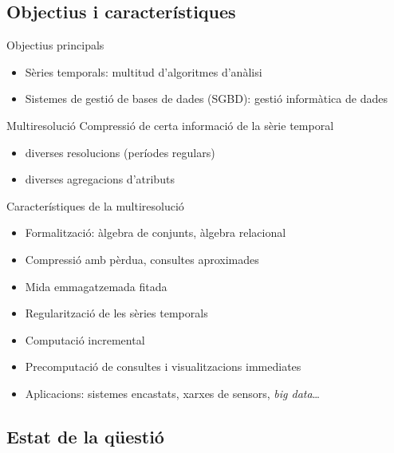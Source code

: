 \subsection{Objectius i característiques}
\begin{frame}{Objectius principals}

  \begin{itemize}
  \item Sèries temporals: multitud d'algoritmes d'anàlisi
  \item Sistemes de gestió de bases de dades (SGBD): gestió informàtica de dades
  \end{itemize} 

\begin{block}{Multiresolució}
  Compressió de certa informació de la sèrie temporal
    \begin{itemize}
    \item diverses resolucions (períodes regulars)
    \item diverses agregacions d'atributs 
    \end{itemize}
\end{block}


\end{frame}


\begin{frame}{Característiques de la multiresolució}

  \begin{itemize}
  \item Formalització: àlgebra de conjunts, àlgebra relacional
  \item Compressió amb pèrdua, consultes aproximades
  \item Mida emmagatzemada fitada
  \item Regularització de les sèries temporals
  \item Computació incremental
  \item Precomputació de consultes i visualitzacions immediates
  \item Aplicacions: sistemes encastats, xarxes de sensors, \emph{big data}\dots
  \end{itemize}

\end{frame}


\subsection{Estat de la qüestió}

